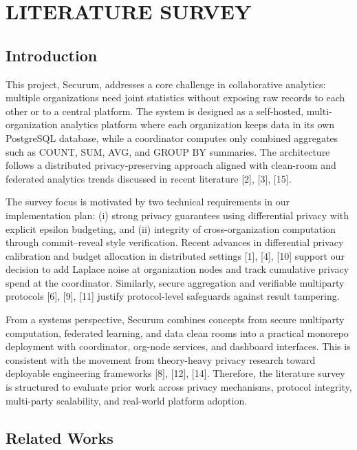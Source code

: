 \chapter{LITERATURE SURVEY}

\section{Introduction}

This project, Securum, addresses a core challenge in collaborative analytics: multiple organizations need joint statistics without exposing raw records to each other or to a central platform. The system is designed as a self-hosted, multi-organization analytics platform where each organization keeps data in its own PostgreSQL database, while a coordinator computes only combined aggregates such as COUNT, SUM, AVG, and GROUP BY summaries. The architecture follows a distributed privacy-preserving approach aligned with clean-room and federated analytics trends discussed in recent literature [2], [3], [15].

The survey focus is motivated by two technical requirements in our implementation plan: (i) strong privacy guarantees using differential privacy with explicit epsilon budgeting, and (ii) integrity of cross-organization computation through commit--reveal style verification. Recent advances in differential privacy calibration and budget allocation in distributed settings [1], [4], [10] support our decision to add Laplace noise at organization nodes and track cumulative privacy spend at the coordinator. Similarly, secure aggregation and verifiable multiparty protocols [6], [9], [11] justify protocol-level safeguards against result tampering.

From a systems perspective, Securum combines concepts from secure multiparty computation, federated learning, and data clean rooms into a practical monorepo deployment with coordinator, org-node services, and dashboard interfaces. This is consistent with the movement from theory-heavy privacy research toward deployable engineering frameworks [8], [12], [14]. Therefore, the literature survey is structured to evaluate prior work across privacy mechanisms, protocol integrity, multi-party scalability, and real-world platform adoption.

\section{Related Works}

